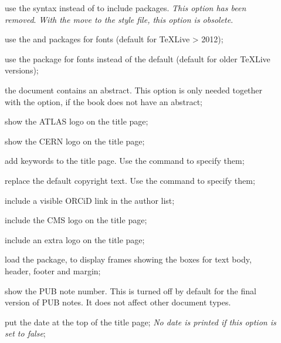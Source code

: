 \begin{description}
\item[] use the syntax 
  instead of  to include packages.
  \emph{ This option has been removed}.
  \emph{ With the move to the  style file, this option is obsolete}.
\item[] use the  and  packages for fonts 
  (default for \TeX Live > 2012);
\item[] use the  package for fonts instead of the default
  (default for older \TeX Live versions);
\item[] the document contains an abstract.
  This option is only needed together with the  option,
  if the book does not have an abstract;
\item[] show the ATLAS logo on the title page;
\item[] show the CERN logo on the title page;
\item[] add keywords to the title page.
  Use the command  to specify them;
\item[] replace the default copyright text.
  Use the command  to specify them;
\item[] include a visible ORCiD link in the author list;
\item[] include the CMS logo on the title page;
\item[] include an extra logo on the title page;
\item[] load the  package, to display frames showing the boxes for text body, header, footer and margin;
\item[] show the PUB note number.
  This is turned off by default for the final version of PUB notes.
  It does not affect other document types.
\item[] put the date at the top of the title page;
  \emph{ No date is printed if this option is set to false};
\end{description}

